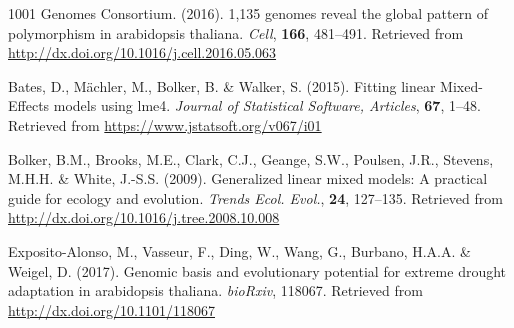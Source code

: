 \documentclass[12pt,]{article}
\begin{document}
\hypertarget{refs}{}
\hypertarget{ref-1001_Genomes_Consortium2016-nw}{}
1001 Genomes Consortium. (2016). 1,135 genomes reveal the global pattern
of polymorphism in arabidopsis thaliana. \emph{Cell}, \textbf{166},
481--491. Retrieved from
\url{http://dx.doi.org/10.1016/j.cell.2016.05.063}

\hypertarget{ref-Bates2015-ly}{}
Bates, D., Mächler, M., Bolker, B. \& Walker, S. (2015). Fitting linear
Mixed-Effects models using lme4. \emph{Journal of Statistical Software,
Articles}, \textbf{67}, 1--48. Retrieved from
\url{https://www.jstatsoft.org/v067/i01}

\hypertarget{ref-Bolker2009-by}{}
Bolker, B.M., Brooks, M.E., Clark, C.J., Geange, S.W., Poulsen, J.R.,
Stevens, M.H.H. \& White, J.-S.S. (2009). Generalized linear mixed
models: A practical guide for ecology and evolution. \emph{Trends Ecol.
Evol.}, \textbf{24}, 127--135. Retrieved from
\url{http://dx.doi.org/10.1016/j.tree.2008.10.008}

\hypertarget{ref-Exposito-Alonso2017-ob}{}
Exposito-Alonso, M., Vasseur, F., Ding, W., Wang, G., Burbano, H.A.A. \&
Weigel, D. (2017). Genomic basis and evolutionary potential for extreme
drought adaptation in arabidopsis thaliana. \emph{bioRxiv}, 118067.
Retrieved from \url{http://dx.doi.org/10.1101/118067}
\end{document}
